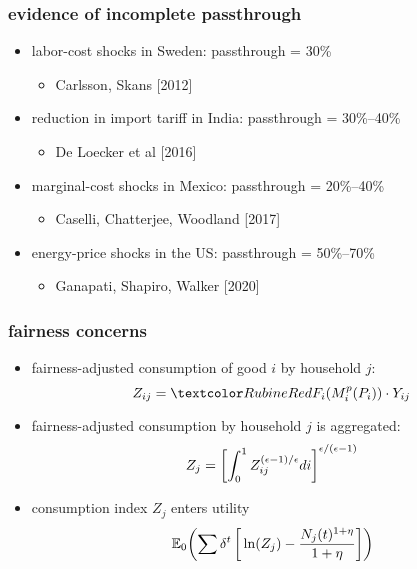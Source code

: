 \documentclass[12pt,xcolor={dvipsnames},hyperref={pdftex,pdfpagemode=UseNone,hidelinks,pdfdisplaydoctitle=true},usepdftitle=false]{beamer}
\begin{document}
\begin{frame}
\frametitle{evidence of incomplete passthrough}
\begin{itemize}
\item labor-cost shocks in Sweden: passthrough = 30\%
\begin{itemize}
	\item Carlsson, Skans [2012]
\end{itemize}
\item reduction in import tariff in India: passthrough = 30\%--40\%
\begin{itemize}
	\item De Loecker et al [2016]
\end{itemize}
\item marginal-cost shocks in Mexico: passthrough = 20\%--40\%
\begin{itemize}
	\item Caselli, Chatterjee, Woodland [2017] 
\end{itemize}
\item energy-price shocks in the US: passthrough = 50\%--70\%
\begin{itemize}
	\item Ganapati, Shapiro, Walker [2020] 
\end{itemize}
\end{itemize}
\end{frame}


\begin{frame}
\end{frame}

\begin{frame}
\frametitle{fairness concerns}
\begin{itemize}
\item fairness-adjusted consumption of good $i$ by household $j$: 
\begin{equation*}
Z_{ij}= \al{F_{i}(M^p_{i}(P_{i}))} \cdot Y_{ij}
\end{equation*}
\item fairness-adjusted consumption by household $j$ is aggregated:
\begin{equation*}
Z_{j} = \left[ \int_{0}^{1} Z_{ij}^{(\epsilon-1)/\epsilon}di \right]^{\epsilon/(\epsilon-1)}
\end{equation*}
\item consumption index $Z_j$ enters utility
\begin{equation*}
\E[0]{\sum \d^{t}  \bs{\ln{Z_{j}}-\frac{N_{j}(t)^{1+\eta}}{1+\eta}}}
\end{equation*}
\end{itemize}
\end{frame}
\end{document}
